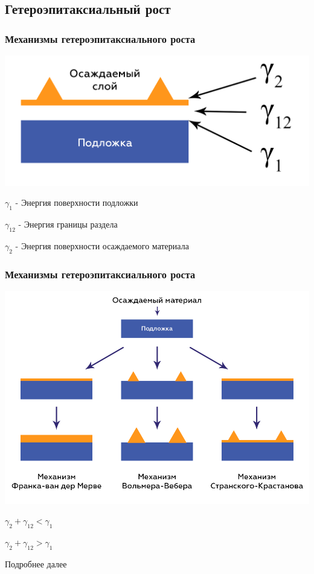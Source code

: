 \documentclass[10pt,pdf,hyperref={unicode}, dvipsnames]{beamer}
\begin{document}
\subsection{Гетероэпитаксиальный рост}
\begin{frame}[t]
	\frametitle{Механизмы гетероэпитаксиального роста}
	\includegraphics[width = \linewidth]{imgs/struct.png}
	\Large

	$\gamma_1$ - Энергия поверхности подложки
	
	
	$\gamma_{12}$ - Энергия границы раздела
	
	
	$\gamma_2$ - Энергия поверхности осаждаемого материала


\end{frame}

\normalsize
\begin{frame}[t]
	\frametitle{Механизмы гетероэпитаксиального роста}
	\includegraphics[width = \linewidth]{imgs/growth.png}

	\centering
	\begin{minipage}{0.32\linewidth}
		\centering
		$ \gamma_2+\gamma_{12}<\gamma_1 $	
	\end{minipage}
	\begin{minipage}{0.32\linewidth}
		\centering
		$ \gamma_2+\gamma_{12}>\gamma_1 $	
	\end{minipage}
	\begin{minipage}{0.32\linewidth}
		\centering
		Подробнее далее
	\end{minipage}

\end{frame}
\end{document}
